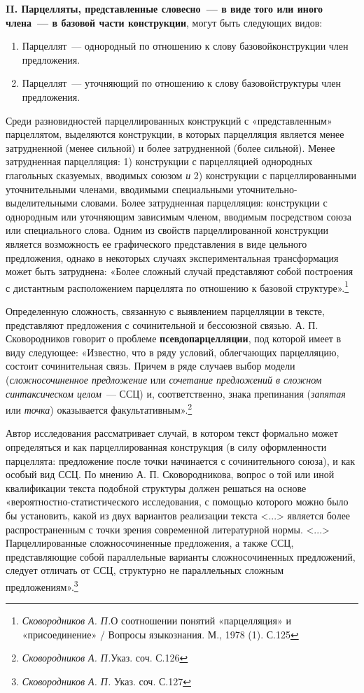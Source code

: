 \documentclass{kursa4}
\begin{document}
{      \textbf{II. Парцелляты, представленные словесно~--- в виде того или иного члена~--- в базовой части конструкции}, могут быть следующих видов: \begin{enumerate}
        \item {Парцеллят~--- однородный по отношению к слову базовой}{конструкции член предложения.}
        \item {Парцеллят~--- уточняющий по отношению к слову базовой}{структуры член предложения.}
      \end{enumerate}

      Среди разновидностей парцеллированных конструкций с «представленным» парцеллятом, выделяются конструкции, в которых парцелляция является менее затрудненной (менее сильной) и более затрудненной (более сильной). Менее затрудненная парцелляция: 1) конструкции с парцелляцией однородных глагольных сказуемых, вводимых союзом \textit{и }2) конструкции с парцеллированными уточнительными членами, вводимыми специальными уточнительно-выделительными словами. Более затрудненная парцелляция: конструкции с однородным или уточняющим зависимым членом, вводимым посредством союза или специального слова. Одним из свойств парцеллированной конструкции является возможность ее графического представления в виде цельного предложения, однако в некоторых случаях экспериментальная трансформация может быть затруднена: «Более сложный случай представляют собой построения с дистантным расположением парцеллята по отношению к базовой структуре».\footnote{\textit{{ Сковородников А. П.}}{О соотношении понятий «парцелляция» и «присоединение» / Вопросы языкознания. М., 1978 (1). С.125}}

      Определенную сложность, связанную с выявлением парцелляции в тексте, представляют предложения с сочинительной и бессоюзной связью. А. П. Сковородников говорит о проблеме \textbf{псевдопарцелляции}, под которой имеет в виду следующее: «Известно, что в ряду условий, облегчающих парцелляцию, состоит сочинительная связь. Причем в ряде случаев выбор модели (\textit{сложносочиненное предложение} или \textit{сочетание предложений в сложном синтаксическом целом}{~--- ССЦ) и, соответственно, знака препинания (}\textit{запятая} или \textit{точка}) оказывается факультативным».\footnote{\textit{Сковородников А. П.}{Указ. соч. С.126}}

      Автор исследования рассматривает случай, в котором текст формально может определяться и как парцеллированная конструкция (в силу оформленности парцеллята: предложение после точки начинается с сочинительного союза), и как особый вид ССЦ. По мнению А. П. Сковородникова, вопрос о той или иной квалификации текста подобной структуры должен решаться на основе «вероятностно-статистического исследования, с помощью которого можно было бы установить, какой из двух вариантов реализации текста \textless{}...\textgreater{} является более распространенным с точки зрения современной литературной нормы. \textless{}...\textgreater{} Парцеллированные сложносочиненные предложения, а также ССЦ, представляющие собой параллельные варианты сложносочиненных предложений, следует отличать от
      {ССЦ, структурно не параллельных сложным предложениям}{».}\footnote{\textit{{ Сковородников А. П. }}{Указ. соч. С.127}}{ }

}
\end{document}

